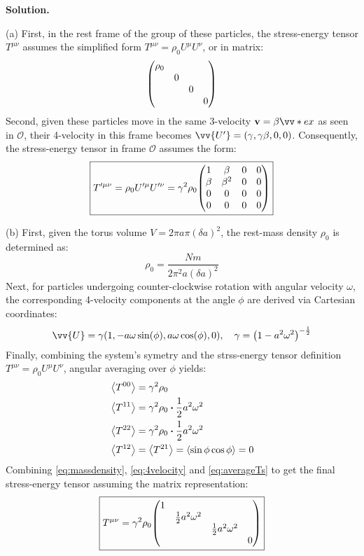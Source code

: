 \documentclass[12pt, a4paper, oneside]{article}
\newenvironment{solution}{\par\noindent\textbf{Solution. }}{\par}
\renewcommand{\vb}[1]{\ensuremath{\mathbf{#1}}}
\begin{document}
\begin{solution}

    (a) First, in the rest frame of the group of these particles, the stress-energy tensor $T^{\mu\nu}$ assumes the simplified form $T^{\mu\nu}=\rho_0 U^\mu U^\nu$, or in matrix:
    \[
    \mqty(\dmat{\rho_0, 0, 0, 0})
    \]
    Second, given these particles move in the same 3-velocity $\vb{v}=\beta\vv*{e}{x}$ as seen in $\mathscr{O}$, their 4-velocity in this frame becomes $\vv{U'}=(\gamma, \gamma\beta, 0, 0)$. Consequently, the stress-energy tensor in frame $\mathscr{O}$ assumes the form:
    \begin{equation}
        \boxed{
        T'^{\mu\nu}=\rho_0U'^\mu U'^\nu=\gamma^2\rho_0 \mqty(1&\beta&0&0\\\beta&\beta^2&0&0\\0&0&0&0\\0&0&0&0)\label{eq:stressenergy}
        }
    \end{equation}
    
    (b) First, given the torus volume $V=2\pi a \pi (\delta a)^2$, the rest-mass density $\rho_0$ is determined as:
    \begin{equation}
        \rho_0 = \frac{Nm}{2\pi^2a(\delta a)^2}\label{eq:massdensity}
    \end{equation}
    Next, for particles undergoing counter-clockwise rotation with angular velocity $\omega$, the corresponding 4-velocity components at the angle $\phi$ are derived via Cartesian coordinates:
    \begin{equation}
        \vv{U}=\gamma\qty(1, -a\omega\sin(\phi), a\omega\cos(\phi), 0), \quad \gamma=\qty(1-a^2\omega^2)^{-\frac{1}{2}}\label{eq:4velocity}
    \end{equation}
    Finally, combining the system's symetry and the strss-energy tensor definition $T^{\mu\nu}=\rho_0U^\mu U^\nu$, angular averaging over $\phi$ yields:
    \begin{equation}
        \begin{split}\label{eq:averageTs}
            &\expval{T^{00}}=\gamma^2\rho_0\\
            &\expval{T^{11}}=\gamma^2\rho_0\vdot\frac{1}{2}a^2\omega^2\\
            &\expval{T^{22}}=\gamma^2\rho_0\vdot\frac{1}{2}a^2\omega^2\\
            &\expval{T^{12}}=\expval{T^{21}}=\expval{\sin\phi\cos\phi}=0
        \end{split}
    \end{equation}
    Combining \cref{eq:massdensity}, \cref{eq:4velocity} and \cref{eq:averageTs} to get the final stress-energy tensor assuming the matrix representation:
    \begin{equation}
        \boxed{
        T^{\mu\nu}=\gamma^2\rho_0\mqty(\dmat{1, \frac{1}{2}a^2\omega^2, \frac{1}{2}a^2\omega^2, 0})\label{eq:singleT}
        }
    \end{equation}


\end{solution}
\end{document}
